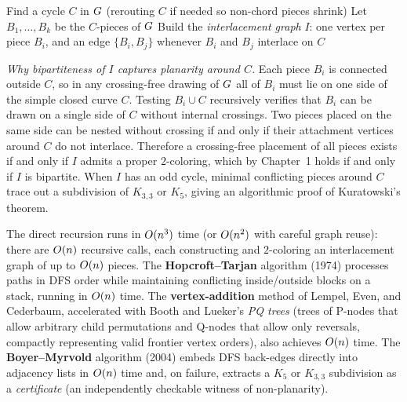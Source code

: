 \begin{algorithm}[H]
\caption{\textsc{PlanarTest}($\Gph$) -- path-addition skeleton}
\label{ch26:alg-planartest}
Find a cycle $C$ in $\Gph$ (rerouting $C$ if needed so non-chord pieces shrink)\;
Let $B_1,\dots,B_k$ be the $C$-pieces of $\Gph$\;
Build the \emph{interlacement graph} $I$: one vertex per piece $B_i$, and an edge $\{B_i,B_j\}$ whenever $B_i$ and $B_j$ interlace on $C$\;
\end{algorithm}

\begin{whybox}
\emph{Why bipartiteness of $I$ captures planarity around $C$.}
Each piece $B_i$ is connected outside $C$, so in any crossing-free drawing of $\Gph$ all
of $B_i$ must lie on one side of the simple closed curve $C$. Testing $B_i \cup C$
recursively verifies that $B_i$ can be drawn on a single side of $C$ without internal
crossings. Two pieces placed on the same side can be nested without crossing if and only if
their attachment vertices around $C$ do not interlace. Therefore a crossing-free placement
of all pieces exists if and only if $I$ admits a proper $2$-coloring, which by Chapter~1
holds if and only if $I$ is bipartite. When $I$ has an odd cycle, minimal conflicting pieces
around $C$ trace out a subdivision of $K_{3,3}$ or $K_5$, giving an algorithmic proof of
Kuratowski's theorem.
\end{whybox}

\begin{complexitybox}
The direct recursion runs in $O(n^3)$ time (or $O(n^2)$ with careful graph reuse):
there are $O(n)$ recursive calls, each constructing and $2$-coloring an interlacement
graph of up to $O(n)$ pieces. The \textbf{Hopcroft--Tarjan} algorithm (1974) processes
paths in DFS order while maintaining conflicting inside/outside blocks on a stack, running
in $O(n)$ time. The \textbf{vertex-addition} method of Lempel, Even, and Cederbaum,
accelerated with Booth and Lueker's \emph{PQ trees} (trees of P-nodes that allow arbitrary
child permutations and Q-nodes that allow only reversals, compactly representing valid
frontier vertex orders), also achieves $O(n)$ time. The \textbf{Boyer--Myrvold} algorithm
(2004) embeds DFS back-edges directly into adjacency lists in $O(n)$ time and, on failure,
extracts a $K_5$ or $K_{3,3}$ subdivision as a \emph{certificate} (an independently
checkable witness of non-planarity).
\end{complexitybox}

